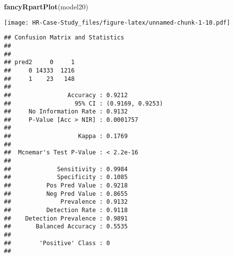 \documentclass[
]{article}
\newenvironment{Shaded}{\begin{snugshade}}{\end{snugshade}}
\newcommand{\DataTypeTok}[1]{\textcolor[rgb]{0.13,0.29,0.53}{#1}}
\newcommand{\KeywordTok}[1]{\textcolor[rgb]{0.13,0.29,0.53}{\textbf{#1}}}
\newcommand{\NormalTok}[1]{#1}
\newcommand{\OperatorTok}[1]{\textcolor[rgb]{0.81,0.36,0.00}{\textbf{#1}}}
\newcommand{\StringTok}[1]{\textcolor[rgb]{0.31,0.60,0.02}{#1}}
\begin{document}
\begin{Shaded}
\begin{Highlighting}[]
\KeywordTok{fancyRpartPlot}\NormalTok{(model20)}
\end{Highlighting}
\end{Shaded}

\texttt{[image: HR-Case-Study\_files/figure-latex/unnamed-chunk-1-10.pdf]}

\begin{Shaded}
\end{Shaded}

\begin{verbatim}
## Confusion Matrix and Statistics
## 
##      
## pred2     0     1
##     0 14333  1216
##     1    23   148
##                                           
##                Accuracy : 0.9212          
##                  95% CI : (0.9169, 0.9253)
##     No Information Rate : 0.9132          
##     P-Value [Acc > NIR] : 0.0001757       
##                                           
##                   Kappa : 0.1769          
##                                           
##  Mcnemar's Test P-Value : < 2.2e-16       
##                                           
##             Sensitivity : 0.9984          
##             Specificity : 0.1085          
##          Pos Pred Value : 0.9218          
##          Neg Pred Value : 0.8655          
##              Prevalence : 0.9132          
##          Detection Rate : 0.9118          
##    Detection Prevalence : 0.9891          
##       Balanced Accuracy : 0.5535          
##                                           
##        'Positive' Class : 0               
## 
\end{verbatim}
\end{document}
